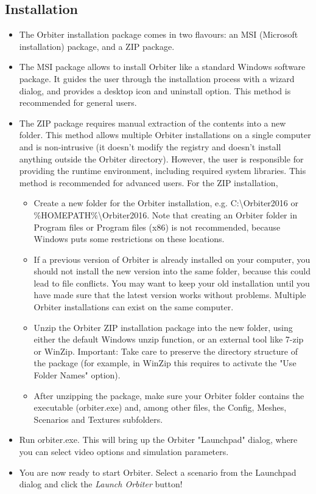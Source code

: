 \documentclass[Orbiter User Manual.tex]{subfiles}
\begin{document}
\subsection{Installation}
\begin{itemize}
\item The Orbiter installation package comes in two flavours: an MSI (Microsoft installation) package, and a ZIP package.
\item The MSI package allows to install Orbiter like a standard Windows software package. It guides the user through the installation process with a wizard dialog, and provides a desktop icon and uninstall option. This method is recommended for general users.
\item The ZIP package requires manual extraction of the contents into a new folder. This method allows multiple Orbiter installations on a single computer and is non-intrusive (it doesn’t modify the registry and doesn’t install anything outside the Orbiter directory). However, the user is responsible for providing the runtime environment, including required system libraries. This method is recommended for advanced users. For the ZIP installation,

\begin{itemize}
\item Create a new folder for the Orbiter installation, e.g. C:\textbackslash Orbiter2016 or \%HOMEPATH\%\textbackslash Orbiter2016. Note that creating an Orbiter folder in Program files or Program files (x86) is not recommended, because Windows puts some restrictions on these locations.
\item If a previous version of Orbiter is already installed on your computer, you should not install the new version into the same folder, because this could lead to file conflicts. You may want to keep your old installation until you have made sure that the latest version works without problems. Multiple Orbiter installations can exist on the same computer.
\item Unzip the Orbiter ZIP installation package into the new folder, using either the default Windows unzip function, or an external tool like 7-zip or WinZip. Important: Take care to preserve the directory structure of the package (for example, in WinZip this requires to activate the "Use Folder Names" option).
\item After unzipping the package, make sure your Orbiter folder contains the executable (orbiter.exe) and, among other files, the Config, Meshes, Scenarios and Textures subfolders.
\end{itemize}

\item Run orbiter.exe. This will bring up the Orbiter "Launchpad" dialog, where you can select video options and simulation parameters.
\item You are now ready to start Orbiter. Select a scenario from the Launchpad dialog and click the \textit{Launch Orbiter} button!
\end{itemize}
\end{document}
